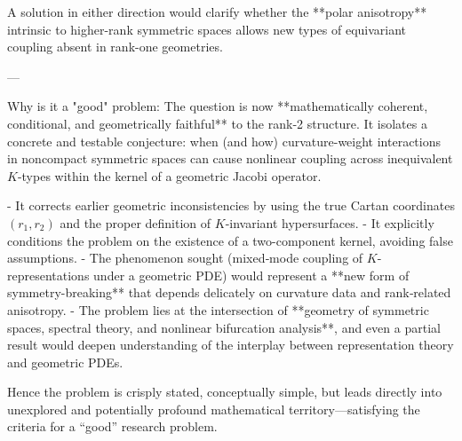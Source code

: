 A solution in either direction would clarify whether the **polar anisotropy** intrinsic to higher-rank symmetric spaces allows new types of equivariant coupling absent in rank-one geometries.

---

Why is it a "good" problem:  
The question is now **mathematically coherent, conditional, and geometrically faithful** to the rank‑2 structure. It isolates a concrete and testable conjecture: when (and how) curvature-weight interactions in noncompact symmetric spaces can cause nonlinear coupling across inequivalent \(K\)-types within the kernel of a geometric Jacobi operator.  

- It corrects earlier geometric inconsistencies by using the true Cartan coordinates \((r_1,r_2)\) and the proper definition of \(K\)-invariant hypersurfaces.  
- It explicitly conditions the problem on the existence of a two-component kernel, avoiding false assumptions.  
- The phenomenon sought (mixed‑mode coupling of \(K\)-representations under a geometric PDE) would represent a **new form of symmetry-breaking** that depends delicately on curvature data and rank‑related anisotropy.  
- The problem lies at the intersection of **geometry of symmetric spaces, spectral theory, and nonlinear bifurcation analysis**, and even a partial result would deepen understanding of the interplay between representation theory and geometric PDEs.  

Hence the problem is crisply stated, conceptually simple, but leads directly into unexplored and potentially profound mathematical territory—satisfying the criteria for a “good” research problem.